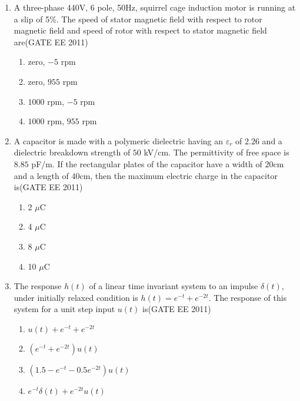 \documentclass[a4paper,10pt]{exam}
\theoremstyle{remark}
\begin{document}
\begin{enumerate}
\begin{multicols}{4}
\begin{enumerate}
  \item orthonormal
  \item orthogonal
  \item parallel
  \item collinear
\end{enumerate}
\end{multicols}

\item A three-phase 440V, 6 pole, 50Hz, squirrel cage induction motor is running at a slip of 5\%. The speed of stator magnetic field with respect to rotor magnetic field and speed of rotor with respect to stator magnetic field are\hfill{(GATE EE 2011)}

\begin{multicols}{2}
\begin{enumerate}
\item zero, $-5$ rpm \item zero, $955$ rpm
\item $1000$ rpm, $-5$ rpm 
\item $1000$ rpm, $955$ rpm
\end{enumerate}
\end{multicols}

\item A capacitor is made with a polymeric dielectric having an $\varepsilon_r$ of $2.26$ and a dielectric breakdown strength of $50$ kV/cm. The permittivity of free space is $8.85$ pF/m. If the rectangular plates of the capacitor have a width of $20$cm and a length of $40$cm, then the maximum electric charge in the capacitor is\hfill{(GATE EE 2011)}
\begin{multicols}{4}
\begin{enumerate}
\item 2 $\mu$C
\item 4 $\mu$C
\item 8 $\mu$C
\item 10 $\mu$C
\end{enumerate}
\end{multicols}


\item \quad The response $h(t)$ of a linear time invariant system to an impulse $\delta(t)$, under initially relaxed condition is $h(t)=e^{-t} + e^{-2t}$. The response of this system for a unit step input $u(t)$ is\hfill{(GATE EE 2011)}

\begin{multicols}{2}
\begin{enumerate}
\item $u(t)+e^{-t}+e^{-2t}$
\item $\left(e^{-t}+e^{-2t}\right)u(t)$
\item $\left(1.5-e^{-t}-0.5e^{-2t}\right)u(t)$
\item  $e^{-t}\delta(t)+e^{-2t}u(t)$


\end{enumerate}
\end{multicols}
\end{enumerate}
\end{document}
